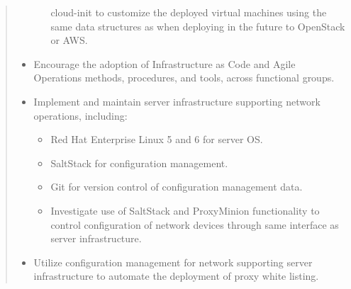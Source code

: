 \begin{quote}
\begin{itemize}
\begin{itemize}
cloud-init to customize the deployed virtual machines using the same data
structures as when deploying in the future to OpenStack or AWS.
\end{itemize}
\item Encourage the adoption of Infrastructure as Code and Agile Operations
methods, procedures, and tools, across functional groups.
\item Implement and maintain server infrastructure supporting network
operations, including:
\begin{itemize}
\item Red Hat Enterprise Linux 5 and 6 for server OS.
\item SaltStack for configuration management.
\item Git for version control of configuration management data.
\item Investigate use of SaltStack and ProxyMinion functionality to control
configuration of network devices through same interface as server
infrastructure.
\end{itemize}
\item Utilize configuration management for network supporting server
infrastructure to automate the deployment of proxy white listing.
\end{itemize}
\end{quote}
